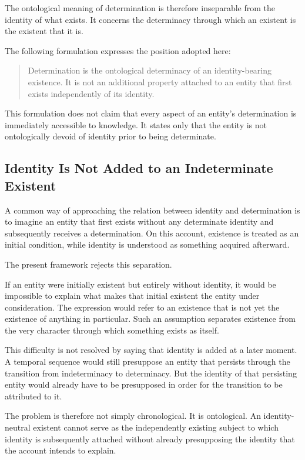 The ontological meaning of determination is therefore inseparable from
the identity of what exists. It concerns the determinacy through which an
existent is the existent that it is.

The following formulation expresses the position adopted here:

\begin{quote}
Determination is the ontological determinacy of an identity-bearing
existence. It is not an additional property attached to an entity that
first exists independently of its identity.
\end{quote}

This formulation does not claim that every aspect of an entity's
determination is immediately accessible to knowledge. It states only
that the entity is not ontologically devoid of identity prior to being
determinate.

\subsection{Identity Is Not Added to an Indeterminate Existent}

A common way of approaching the relation between identity and
determination is to imagine an entity that first exists without any
determinate identity and subsequently receives a determination. On this
account, existence is treated as an initial condition, while identity is
understood as something acquired afterward.

The present framework rejects this separation.

If an entity were initially existent but entirely without identity, it
would be impossible to explain what makes that initial existent the
entity under consideration. The expression would refer to an existence
that is not yet the existence of anything in particular. Such an
assumption separates existence from the very character through which
something exists as itself.

This difficulty is not resolved by saying that identity is added at a
later moment. A temporal sequence would still presuppose an entity that
persists through the transition from indeterminacy to determinacy.
But the identity of that persisting entity would already have to be
presupposed in order for the transition to be attributed to it.

The problem is therefore not simply chronological. It is ontological.
An identity-neutral existent cannot serve as the independently existing
subject to which identity is subsequently attached without already
presupposing the identity that the account intends to explain.

